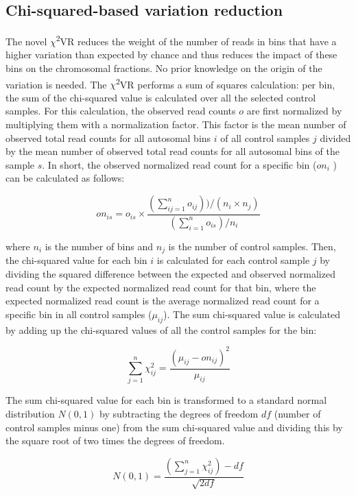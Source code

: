 \subsection{Chi-squared-based variation reduction}
The novel $\chi$\textsuperscript{2}VR reduces the weight of the number of reads in bins that have a higher variation than expected by chance and thus reduces the impact of these bins on the chromosomal fractions. 
No prior knowledge on the origin of the variation is needed. 
The $\chi$\textsuperscript{2}VR performs a sum of squares calculation: per bin, the sum of the chi-squared value is calculated over all the selected control samples. 
For this calculation, the observed read counts $o$ are first normalized by multiplying them with a normalization factor. 
This factor is the mean number of observed total read counts for all autosomal bins $i$ of all control samples $j$ divided by the mean number of observed total read counts for all autosomal bins of the sample $s$. 
In short, the observed normalized read count for a specific bin ($on_i$ ) can be calculated as follows:

\begin{equation*}
	on_{is} = o_{is} \times \frac{(\sum^n_{ij=1}o_{ij})) / (n_i \times n_j)}{(\sum^n_{i=1}o_{is})/n_i}
\end{equation*}


\noindent where $n_i$ is the number of bins and $n_j$ is the number of control samples. 
Then, the chi-squared value for each bin $i$ is calculated for each control sample $j$ by dividing the squared difference between the expected and observed normalized read count by the expected normalized read count for that bin, where the expected normalized read count is the average normalized read count for a specific bin in all control samples ($\mu_{ij}$). 
The sum chi-squared value is calculated by adding up the chi-squared values of all the control samples for the bin:

\begin{equation*}
	\sum^n_{j=1}\chi_{ij}^2 = \frac{(\mu_{ij} - on_{ij})^2}{\mu_{ij}}
\end{equation*}

\noindent The sum chi-squared value for each bin is transformed to a standard normal distribution $N(0, 1)$ by subtracting the degrees of freedom $df$ (number of control samples minus one) from the sum chi-squared value and dividing this by the square root of two times the degrees of freedom.

\begin{equation*}
	N(0,1) = \frac{(\sum^n_{j=1}\chi_{ij}^2) - df} {\sqrt{2df}}
\end{equation*}

